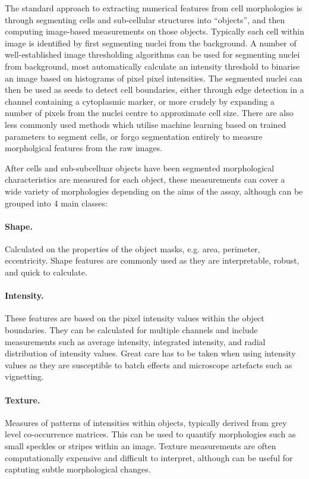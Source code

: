 \documentclass[a4paper,11pt,twoside,openright]{scrbook}
\begin{document}
The standard approach to extracting numerical features from cell morphologies is through segmenting cells and sub-cellular structures into ``objects'', and then computing image-based measurements on those objects.
Typically each cell within image is identified by first segmenting nuclei from the background.
A number of well-established image thresholding algorithms can be used for segmenting nuclei from background, most automatically calculate an intensity threshold to binarise an image based on histograms of pixel pixel intensities.\cite{Otsu1979,Padmanabhan2010}
The segmented nuclei can then be used as seeds to detect cell boundaries, either through edge detection in a channel containing a cytoplasmic marker, or more crudely by expanding a number of pixels from the nuclei centre to approximate cell size.
There are also less commonly used methods which utilise machine learning based on trained parameters to segment cells, \cite{Sommer2011} or forgo segmentation entirely to measure morpholgical features from the raw images. \cite{Rajaram2012,Orlov2008}

After cells and sub-subcelluar objects have been segmented morphological characteristics are measured for each object, these measurements can cover a wide variety of morphologies depending on the aims of the assay, although can be grouped into 4 main classes:

\paragraph{Shape.}
Calculated on the properties of the object masks, e.g. area, perimeter, eccentricity. Shape features are commonly used as they are interpretable, robust, and quick to calculate.

\paragraph{Intensity.}
These features are based on the pixel intensity values within the object boundaries.
They can be calculated for multiple channels and include measurements such as average intensity, integrated intensity, and radial distribution of intensity values.
Great care has to be taken when using intensity values as they are susceptible to batch effects and microscope artefacts such as vignetting. \cite{Goldman2010}

\paragraph{Texture.}
Measures of patterns of intensities within objects, typically derived from grey level co-occurrence matrices. \cite{Haralick1973} 
This can be used to quantify morphologies such as small speckles or stripes within an image.
Texture measurements are often computationally expensive and difficult to interpret, although can be useful for captuting subtle morphological changes.
\end{document}
